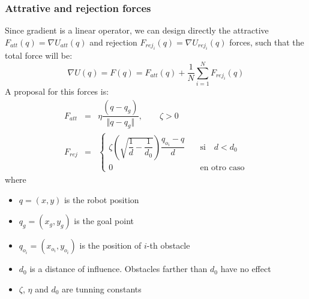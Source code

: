 \begin{frame}\frametitle{Attrative and rejection forces}
  Since gradient is a linear operator, we can design directly the attractive $F_{att}(q) = \nabla U_{att}(q)$ and rejection $F_{rej_i}(q) = \nabla U_{rej_i}(q)$ forces, such that the total force will be:
  \[ \nabla U(q) = F(q) = F_{att}(q) + \frac{1}{N}\sum_{i=1}^N F_{rej_i}(q)\]
  A proposal for this forces is:
  \begin{eqnarray*}
    \label{eq:attractive}
    F_{att} &=& \eta \dfrac{\left(q - q_g\right) }{\Vert q - q_g \Vert},\qquad \zeta > 0\label{eq:PotFieldsAttraction}\\
    F_{rej} &=& \begin{cases}
                  \zeta\left(\sqrt{\dfrac{1}{d} - \dfrac{1}{d_0}}\right)\dfrac{q_{o_i} - q}{d}
                  & \quad\textrm{si}\quad d < d_0\\
                  0 & \quad\textrm{en otro caso}
                \end{cases}
  \end{eqnarray*}
  where
  \begin{itemize}
  \item $q=(x,y)$ is the robot position
  \item $q_g=(x_g, y_g)$ is the goal point
  \item $q_{o_i} = (x_{o_i}, y_{o_i})$ is the position of $i$-th obstacle
  \item $d_0$ is a distance of influence. Obstacles farther than $d_0$ have no effect
  \item $\zeta$, $\eta$ and $d_0$ are tunning constants
  \end{itemize}
\end{frame}

